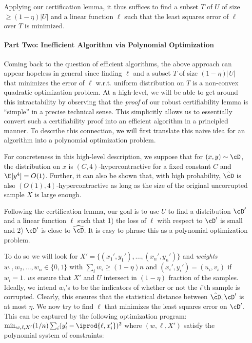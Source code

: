 Applying our certification lemma, it thus suffices to find a subset $T$ of $U$ of size $\geq (1-\eta)|U|$ and a linear function $\ell$ such that the least squares error of $\ell$ over $T$ is minimized. %



\paragraph{Part Two: Inefficient Algorithm via Polynomial Optimization}
Coming back to the question of efficient algorithms, the above approach can appear hopeless in general since finding $\ell$ and a subset $T$ of size $(1-\eta)|U|$ that minimizes the error of $\ell$ w.r.t. uniform distribution on $T$ is a non-convex quadratic optimization problem. At a high-level, we will be able to get around this intractability by observing that the \emph{proof} of our robust certifiability lemma is ``simple'' in a precise technical sense. This simplicitly allows us to essentially convert such a certifiability proof into an efficient algorithm in a principled manner. To describe this connection, we will first translate this naive idea for an algorithm into a polynomial optimization problem. 

For concreteness in this high-level description, we suppose that for $(x,y) \sim \cD$, the distribution on $x$ is $(C,4)$-hypercontractive for a fixed constant $C$ and $\E[y^4] = O(1)$. Further, it can also be shown that, with high probability, $\hat{\cD}$ is also $(O(1), 4)$-hypercontractive as long as the size of the original uncorrupted sample $X$ is large enough.

Following the certification lemma, our goal is to use $U$ to find a distribution $\cD'$ and a linear function $\ell$ such that 1) the loss of $\ell$ with respect to $\cD'$ is small and 2) $\cD'$ is close to $\widehat{\cD}$. It is easy to phrase this as a polynomial optimization problem.

To do so we will look for $X' = \{(x_1',y_1'),\ldots,(x_n',y_n')\}$ and \emph{weights} $w_1,w_2,\ldots, w_n \in \{0,1\}$ with $\sum_i w_i \geq (1- \eta) n$ and $(x_i',y_i') = (u_i,v_i)$ if $w_i = 1$. $w$s ensure that $X'$ and $U$ intersect in $(1-\eta)$ fraction of the samples. Ideally, we intend $w_i$'s to be the indicators of whether or not the $i$'th sample is corrupted. Clearly, this ensures that the statistical distance between $\hat{\cD}, \cD'$ is at most $\eta$. We now try to find $\ell$ that minimizes the least squares error on $\cD'$. This can be captured by the following optimization program: $\min_{w,\ell,X'} (1/n) \sum_i (y_i' - \iprod{\ell,x_i'})^2$ where $(w,\ell,X')$ satisfy the polynomial system of constraints:

